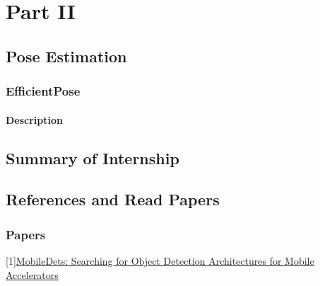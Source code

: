 \documentclass[12pt , a4paper]{report}
\begin{document}
\part{Part II}
\chapter{Pose Estimation}
\section{EfficientPose}
\subsection{Description}

%
%
\chapter{Summary of Internship}

%
%
\chapter{References and Read Papers}
\section{Papers}
[1]\href{https://openaccess.thecvf.com/content/CVPR2021/html/Xiong\_MobileDets\_Searching\_for\_Object\_Detection\_Architectures\_for\_Mobile\_Accelerators\_CVPR\_2021\_paper.html}{MobileDets: Searching for Object Detection Architectures for Mobile Accelerators}\\[3pt]
\end{document}
